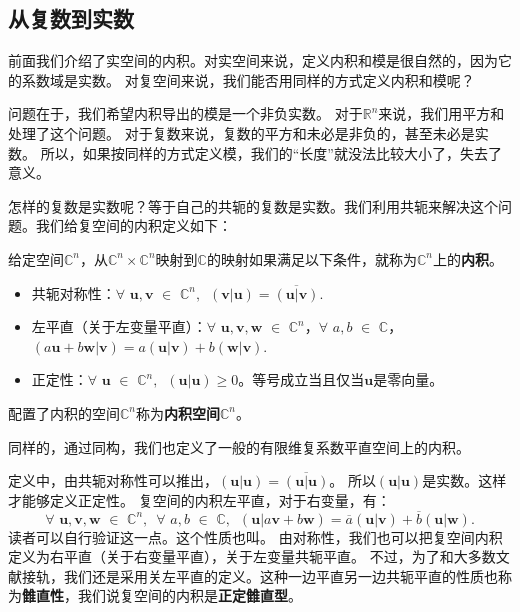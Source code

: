\documentclass[12pt,UTF8]{ctexbook}
\begin{document}
\subsection{从复数到实数}
前面我们介绍了实空间的内积。对实空间来说，定义内积和模是很自然的，因为它的系数域是实数。
对复空间来说，我们能否用同样的方式定义内积和模呢？

问题在于，我们希望内积导出的模是一个非负实数。
对于$\mathbb{R}^n$来说，我们用平方和处理了这个问题。
对于复数来说，复数的平方和未必是非负的，甚至未必是实数。
所以，如果按同样的方式定义模，我们的“长度”就没法比较大小了，失去了意义。

怎样的复数是实数呢？等于自己的共轭的复数是实数。我们利用共轭来解决这个问题。我们给复空间的内积定义如下：
\begin{df}\label{df:7_3}
    给定空间$\mathbb{C}^n$，从$\mathbb{C}^n \times \mathbb{C}^n$映射到$\mathbb{C}$的映射如果满足以下条件，就称为$\mathbb{C}^n$上的\textbf{内积}。
    \begin{itemize}
        \item 共轭对称性：$\forall \,\, \mathbf{u}, \mathbf{v} \,\, \in \,\, \mathbb{C}^n, \,\,\, (\mathbf{v}|\mathbf{u}) = \overline{(\mathbf{u}|\mathbf{v})}.$
        \item 左平直（关于左变量平直）：$\forall \,\, \mathbf{u}, \mathbf{v}, \mathbf{w} \,\, \in \,\, \mathbb{C}^n$，$\forall \,\,a, b \,\, \in \,\, \mathbb{C}$，$ (a\mathbf{u}+b\mathbf{w}|\mathbf{v}) = a(\mathbf{u}|\mathbf{v}) + b(\mathbf{w}|\mathbf{v}).$
        \item 正定性：$\forall \,\, \mathbf{u} \,\, \in \,\, \mathbb{C}^n, \,\,\, (\mathbf{u}|\mathbf{u}) \geqslant 0$。等号成立当且仅当$\mathbf{u}$是零向量。
    \end{itemize}
    
    配置了内积的空间$\mathbb{C}^n$称为\textbf{内积空间}$\mathbb{C}^n$。
\end{df}
同样的，通过同构，我们也定义了一般的有限维复系数平直空间上的内积。

定义中，由共轭对称性可以推出，$(\mathbf{u}|\mathbf{u}) = \overline{(\mathbf{u}|\mathbf{u})}$。
所以$(\mathbf{u}|\mathbf{u})$是实数。这样才能够定义正定性。
复空间的内积左平直，对于右变量，有：
$$\forall \,\, \mathbf{u}, \mathbf{v}, \mathbf{w} \,\, \in \,\, \mathbb{C}^n, \,\,\, \forall \,\,a, b \,\, \in \,\, \mathbb{C}, \,\,\, (\mathbf{u}|a\mathbf{v}+b\mathbf{w}) = \overline{a}(\mathbf{u}|\mathbf{v}) + \overline{b}(\mathbf{u}|\mathbf{w}).$$
读者可以自行验证这一点。这个性质也叫。
由对称性，我们也可以把复空间内积定义为右平直（关于右变量平直），关于左变量共轭平直。
不过，为了和大多数文献接轨，我们还是采用关左平直的定义。这种一边平直另一边共轭平直的性质也称为\textbf{雔直性}，我们说复空间的内积是\textbf{正定雔直型}。
\end{document}
